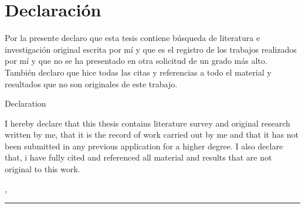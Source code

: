 %
\chapter*{Declaración}
\label{sec:declaration}
\thispagestyle{empty}

Por la presente declaro que esta tesis contiene búsqueda de literatura e investigación original escrita por mí y que es el registro de los trabajos realizados por mí y que no se ha presentado en otra solicitud de un grado más alto. También declaro que hice todas las citas y referencias a todo el material y resultados que no son originales de este trabajo.

\vspace*{10mm}
{Declaration}
\thispagestyle{empty}

I hereby declare that this thesis contains literature survey and original research written by me, that it is the record of work carried out by me and that it has not been submitted in any previous application for a higher degree. I also declare that, i have fully cited and referenced all material and results that are not original to this work.

\bigskip

\noindent\textit{\thesisUniversityCity, \thesisDate}

\smallskip

\begin{flushright}
	\begin{minipage}{5cm}
		\rule{\textwidth}{1pt}
        \centering\thesisName
	\end{minipage}
\end{flushright}

